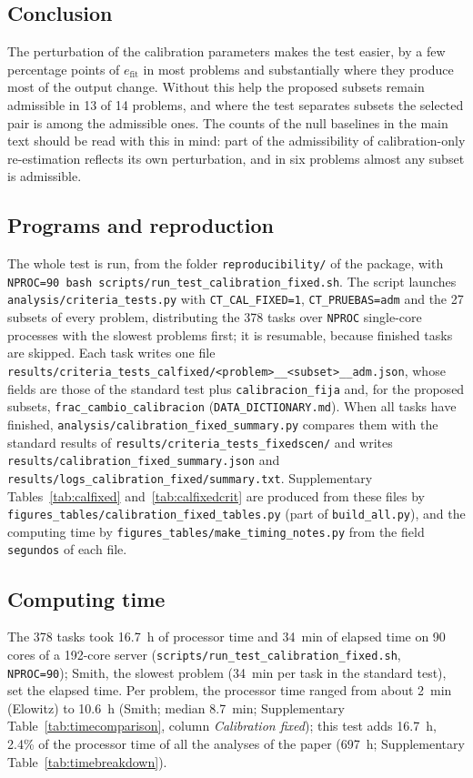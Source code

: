 \subsection*{Conclusion}
The perturbation of the calibration parameters makes the test easier, by a few percentage points of $e_{\mathrm{fit}}$ in most problems and substantially where they produce most of the output change. Without this help the proposed subsets remain admissible in 13 of 14 problems, and where the test separates subsets the selected pair is among the admissible ones. The counts of the null baselines in the main text should be read with this in mind: part of the admissibility of calibration-only re-estimation reflects its own perturbation, and in six problems almost any subset is admissible.

\subsection*{Programs and reproduction}
The whole test is run, from the folder \texttt{reproducibility/} of the package, with \texttt{NPROC=90 bash scripts/run\_test\_calibration\_fixed.sh}. The script launches \texttt{analysis/criteria\_tests.py} with \texttt{CT\_CAL\_FIXED=1}, \texttt{CT\_PRUEBAS=adm} and the 27 subsets of every problem, distributing the 378 tasks over \texttt{NPROC} single-core processes with the slowest problems first; it is resumable, because finished tasks are skipped. Each task writes one file \texttt{results/criteria\_tests\_calfixed/<problem>\_\_<subset>\_\_adm.json}, whose fields are those of the standard test plus \texttt{calibracion\_fija} and, for the proposed subsets, \texttt{frac\_cambio\_calibracion} (\texttt{DATA\_DICTIONARY.md}). When all tasks have finished, \texttt{analysis/calibration\_fixed\_summary.py} compares them with the standard results of \texttt{results/criteria\_tests\_fixedscen/} and writes \texttt{results/calibration\_fixed\_summary.json} and \texttt{results/logs\_calibration\_fixed/summary.txt}. Supplementary Tables~\ref{tab:calfixed} and~\ref{tab:calfixedcrit} are produced from these files by \texttt{figures\_tables/calibration\_fixed\_tables.py} (part of \texttt{build\_all.py}), and the computing time by \texttt{figures\_tables/make\_timing\_notes.py} from the field \texttt{segundos} of each file.

\subsection*{Computing time}
The 378 tasks took 16.7~h of processor time and 34~min of elapsed time on 90 cores of a 192-core server (\texttt{scripts/run\_test\_calibration\_fixed.sh}, \texttt{NPROC=90}); Smith, the slowest problem (34~min per task in the standard test), set the elapsed time. Per problem, the processor time ranged from about 2~min (Elowitz) to 10.6~h (Smith; median 8.7~min; Supplementary Table~\ref{tab:timecomparison}, column \emph{Calibration fixed}); this test adds 16.7~h, 2.4\% of the processor time of all the analyses of the paper (697~h; Supplementary Table~\ref{tab:timebreakdown}).

{\small

}


